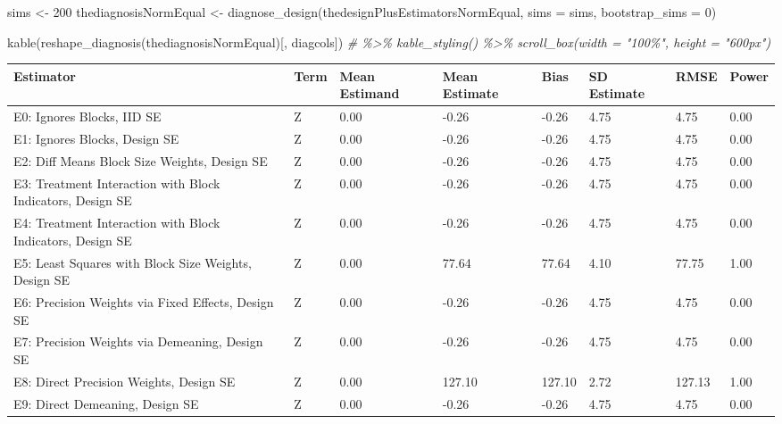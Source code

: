 \documentclass[
  12pt,
]{book}
\newenvironment{Shaded}{\begin{snugshade}}{\end{snugshade}}
\newcommand{\AttributeTok}[1]{\textcolor[rgb]{0.77,0.63,0.00}{#1}}
\newcommand{\CommentTok}[1]{\textcolor[rgb]{0.56,0.35,0.01}{\textit{#1}}}
\newcommand{\DecValTok}[1]{\textcolor[rgb]{0.00,0.00,0.81}{#1}}
\newcommand{\FunctionTok}[1]{\textcolor[rgb]{0.00,0.00,0.00}{#1}}
\newcommand{\NormalTok}[1]{#1}
\newcommand{\OtherTok}[1]{\textcolor[rgb]{0.56,0.35,0.01}{#1}}
\theoremstyle{definition}
\theoremstyle{definition}
\theoremstyle{definition}
\theoremstyle{remark}
\begin{document}
\begin{Shaded}
\begin{Highlighting}[]
\NormalTok{sims }\OtherTok{\textless{}{-}} \DecValTok{200}
\NormalTok{thediagnosisNormEqual }\OtherTok{\textless{}{-}} \FunctionTok{diagnose\_design}\NormalTok{(thedesignPlusEstimatorsNormEqual, }\AttributeTok{sims =}\NormalTok{ sims, }\AttributeTok{bootstrap\_sims =} \DecValTok{0}\NormalTok{)}
\end{Highlighting}
\end{Shaded}

\begin{Shaded}
\begin{Highlighting}[]
\FunctionTok{kable}\NormalTok{(}\FunctionTok{reshape\_diagnosis}\NormalTok{(thediagnosisNormEqual)[, diagcols]) }\CommentTok{\# \%\textgreater{}\% kable\_styling() \%\textgreater{}\% scroll\_box(width = "100\%", height = "600px")}
\end{Highlighting}
\end{Shaded}

\begin{tabular}{l|l|l|l|l|l|l|l}
\hline
Estimator & Term & Mean Estimand & Mean Estimate & Bias & SD Estimate & RMSE & Power\\
\hline
E0: Ignores Blocks, IID SE & Z & 0.00 & -0.26 & -0.26 & 4.75 & 4.75 & 0.00\\
\hline
E1: Ignores Blocks, Design SE & Z & 0.00 & -0.26 & -0.26 & 4.75 & 4.75 & 0.00\\
\hline
E2: Diff Means Block Size Weights, Design SE & Z & 0.00 & -0.26 & -0.26 & 4.75 & 4.75 & 0.00\\
\hline
E3: Treatment Interaction with Block Indicators, Design SE & Z & 0.00 & -0.26 & -0.26 & 4.75 & 4.75 & 0.00\\
\hline
E4: Treatment Interaction with Block Indicators, Design SE & Z & 0.00 & -0.26 & -0.26 & 4.75 & 4.75 & 0.00\\
\hline
E5: Least Squares with Block Size Weights, Design SE & Z & 0.00 & 77.64 & 77.64 & 4.10 & 77.75 & 1.00\\
\hline
E6: Precision Weights via Fixed Effects, Design SE & Z & 0.00 & -0.26 & -0.26 & 4.75 & 4.75 & 0.00\\
\hline
E7: Precision Weights via Demeaning, Design SE & Z & 0.00 & -0.26 & -0.26 & 4.75 & 4.75 & 0.00\\
\hline
E8: Direct Precision Weights, Design SE & Z & 0.00 & 127.10 & 127.10 & 2.72 & 127.13 & 1.00\\
\hline
E9: Direct Demeaning, Design SE & Z & 0.00 & -0.26 & -0.26 & 4.75 & 4.75 & 0.00\\
\hline
\end{tabular}
\end{document}
